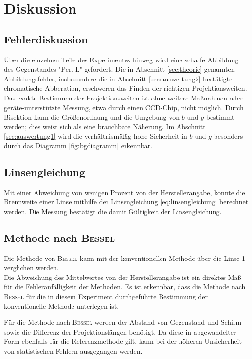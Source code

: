 \section{Diskussion}
\label{sec:Diskussion}
\subsection{Fehlerdiskussion}
Über die einzelnen Teile des Experimentes hinweg wird eine scharfe Abbildung des Gegenstandes "Perl L" gefordert.
Die in Abschnitt \ref{sec:theorie} genannten Abbildungsfehler, 
insbesondere die in Abschnitt \ref{sec:auswertung2} bestätigte chromatische Abberation, 
erschweren das Finden der richtigen Projektionsweiten. 
Das exakte Bestimmen der Projektionsweiten ist ohne weitere Maßnahmen oder geräte-unterstützte Messung, etwa durch einen CCD-Chip, nicht möglich.
Durch Bisektion kann die Größenordnung und die Umgebung von $b$ und $g$ bestimmt werden; dies weist sich als eine brauchbare Näherung.
Im Abschnitt \ref{sec:auswertung1} wird die verhältnismäßig hohe Sicherheit in $b$ und $g$ besonders durch das Diagramm \ref{fig:bgdiagramm} erkennbar.

\subsection{Linsengleichung}
Mit einer Abweichung von wenigen Prozent von der Herstellerangabe, konnte die Brennweite einer Linse mithilfe der Linsengleichung \eqref{eq:linsengleichung} berechnet werden.
Die Messung bestätigt die damit Gültigkeit der Linsengleichung.

\subsection{Methode nach \texorpdfstring{\textsc{Bessel}}{Bessel}}
Die Methode von \texorpdfstring{\textsc{Bessel}}{Bessel} kann mit der konventionellen Methode über die Linse 1 verglichen werden.\\
Die Abweichung des Mittelwertes von der Herstellerangabe ist ein direktes Maß für die Fehleranfälligkeit der Methoden. 
Es ist erkennbar, dass die Methode nach \texorpdfstring{\textsc{Bessel}}{Bessel} für die in diesem Experiment durchgeführte Bestimmung der konventionelle Methode unterlegen ist.

Für die Methode nach \texorpdfstring{\textsc{Bessel}}{Bessel} werden der Abstand von Gegenstand und Schirm sowie die Differenz der Projektionslängen benötigt. 
Da diese in abgewandelter Form ebenfalls für die Referenzmethode gilt, kann bei der höheren Unsicherheit von statistischen Fehlern ausgegangen werden.

